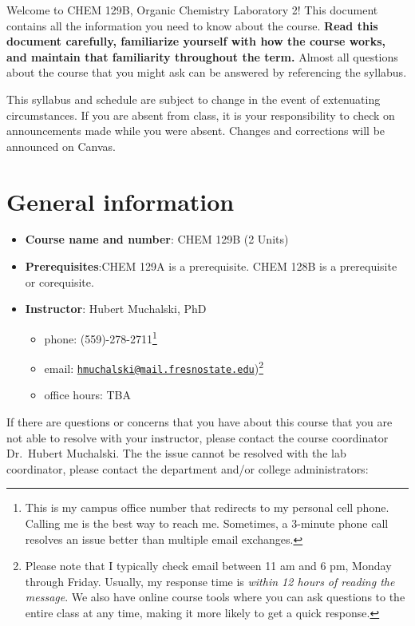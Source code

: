 Welcome to CHEM 129B, Organic Chemistry Laboratory 2! This document
contains all the information you need to know about the course.
\textbf{Read this document carefully, familiarize yourself with how the
course works, and maintain that familiarity throughout the term.} Almost
all questions about the course that you might ask can be answered by
referencing the syllabus.

This syllabus and schedule are subject to change in the event of
extenuating circumstances. If you are absent from class, it is your
responsibility to check on announcements made while you were absent.
Changes and corrections will be announced on Canvas.

\hypertarget{general-information}{%
\section{General information}\label{general-information}}

\begin{itemize}
\tightlist
\item
  \textbf{Course name and number}: CHEM 129B (2 Units)
\item
  \textbf{Prerequisites}:CHEM 129A is a prerequisite. CHEM 128B is a
  prerequisite or corequisite.
\item
  \textbf{Instructor}: Hubert Muchalski, PhD

  \begin{itemize}
  \tightlist
  \item
    phone: (559)-278-2711\footnote{This is my campus office number that
      redirects to my personal cell phone. Calling me is the best way to
      reach me. Sometimes, a 3-minute phone call resolves an issue
      better than multiple email exchanges.}
  \item
    email:
    \href{mailto:hmuchalski@mail.fresnostate.edu}{\nolinkurl{hmuchalski@mail.fresnostate.edu}})\footnote{Please
      note that I typically check email between 11 am and 6 pm, Monday
      through Friday. Usually, my response time is \emph{within 12 hours
      of reading the message}. We also have online course tools where
      you can ask questions to the entire class at any time, making it
      more likely to get a quick response.}
  \item
    office hours: TBA
  \end{itemize}
\end{itemize}

If there are questions or concerns that you have about this course that
you are not able to resolve with your instructor, please contact the
course coordinator Dr.~Hubert Muchalski. The the issue cannot be
resolved with the lab coordinator, please contact the department and/or
college administrators:


